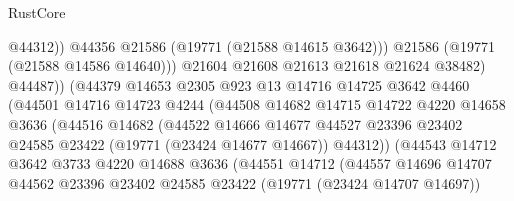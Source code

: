 \begin{lexlean}{RustCore}
\begin{coremodule}
                                        @44312))
                                    @44356
                                    @21586
                                    (@19771 (@21588 @14615 @3642)))
                                  @21586
                                  (@19771 (@21588 @14586 @14640)))
                                @21604
                                @21608
                                @21613
                                @21618
                                @21624
                                @38482)
                              @44487))
                          (@44379
                            @14653
                            @2305
                            @923
                            @13
                            @14716
                            @14725
                            @3642
                            @4460
                            (@44501
                              @14716
                              @14723
                              @4244
                              (@44508
                                @14682
                                @14715
                                @14722
                                @4220
                                @14658
                                @3636
                                (@44516
                                  @14682
                                  (@44522
                                    @14666
                                    @14677
                                    @44527
                                    @23396
                                    @23402
                                    @24585
                                    @23422
                                    (@19771 (@23424 @14677 @14667))
                                    @44312))
                                (@44543
                                  @14712
                                  @3642
                                  @3733
                                  @4220
                                  @14688
                                  @3636
                                  (@44551
                                    @14712
                                    (@44557
                                      @14696
                                      @14707
                                      @44562
                                      @23396
                                      @23402
                                      @24585
                                      @23422
                                      (@19771 (@23424 @14707 @14697))

\end{coremodule}
\end{lexlean}
